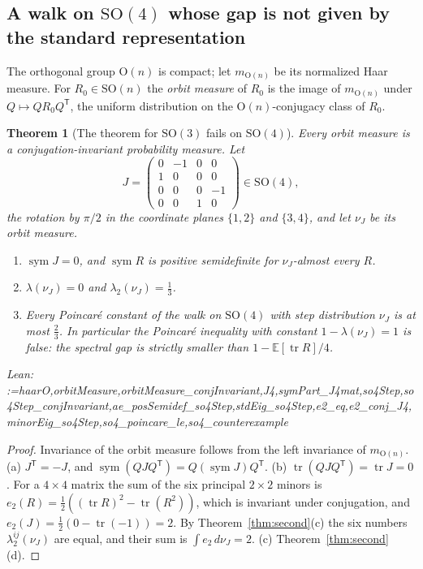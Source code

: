 \documentclass[11pt]{amsart}
\makeatletter
\newtheorem{theorem}{Theorem}[section]
\theoremstyle{definition}
\theoremstyle{remark}
\newcommand{\@leanlist}[1]{\def\@leansep{}\@for\@leanname:=#1\do{\@leansep
  \texttt{\expandafter\detokenize\expandafter{\@leanname}}\def\@leansep{, }}}
\newcommand{\lean}[1]{\par\smallskip\noindent
  {\footnotesize\normalfont\raggedright\textsf{Lean:} \@leanlist{#1}\par}}
\newcommand{\E}{\mathbb{E}}
\newcommand{\SO}{\mathrm{SO}}
\newcommand{\Or}{\mathrm{O}}
\newcommand{\tr}{\operatorname{tr}}
\newcommand{\sym}{\operatorname{sym}}
\newcommand{\transp}{^{\mathsf T}}
\makeatother
\begin{document}
\subsection{A walk on \texorpdfstring{$\SO(4)$}{SO(4)} whose gap is not given by the standard representation}
The orthogonal group $\Or(n)$ is compact; let $m_{\Or(n)}$ be its normalized Haar measure.  For
$R_0\in\SO(n)$ the \emph{orbit measure} of $R_0$ is the image of $m_{\Or(n)}$ under
$Q\mapsto QR_0Q\transp$, the uniform distribution on the $\Or(n)$-conjugacy class of $R_0$.

\begin{theorem}[The theorem for $\SO(3)$ fails on $\SO(4)$]\label{thm:so4}
Every orbit measure is a conjugation-invariant probability measure.  Let
\[
  J=\begin{pmatrix}0&-1&0&0\\1&0&0&0\\0&0&0&-1\\0&0&1&0\end{pmatrix}\in\SO(4),
\]
the rotation by $\pi/2$ in the coordinate planes $\{1,2\}$ and $\{3,4\}$, and let $\nu_J$ be its
orbit measure.
\begin{enumerate}
\item[(a)] $\sym J=0$, and $\sym R$ is positive semidefinite for $\nu_J$-almost every $R$.
\item[(b)] $\lambda(\nu_J)=0$ and $\lambda_2(\nu_J)=\tfrac13$.
\item[(c)] Every Poincar\'e constant of the walk on $\SO(4)$ with step distribution $\nu_J$ is
at most $\tfrac23$.  In particular the Poincar\'e inequality with constant
$1-\lambda(\nu_J)=1$ is false: the spectral gap is strictly smaller than
$1-\E[\tr R]/4$.
\end{enumerate}
\lean{haarO,orbitMeasure,orbitMeasure_conjInvariant,J4,symPart_J4mat,so4Step,so4Step_conjInvariant,ae_posSemidef_so4Step,stdEig_so4Step,e2_eq,e2_conj_J4,minorEig_so4Step,so4_poincare_le,so4_counterexample}
\end{theorem}

\begin{proof}
Invariance of the orbit measure follows from the left invariance of $m_{\Or(n)}$.  (a)
$J\transp=-J$, and $\sym(QJQ\transp)=Q(\sym J)Q\transp$.  (b) $\tr(QJQ\transp)=\tr J=0$.  For a $4\times4$ matrix the sum of the six
principal $2\times2$ minors is $e_2(R)=\tfrac12((\tr R)^2-\tr(R^2))$, which is invariant under
conjugation, and $e_2(J)=\tfrac12(0-\tr(-1))=2$.  By Theorem~\ref{thm:second}(c) the six numbers
$\lambda_2^{ij}(\nu_J)$ are equal, and their sum is $\int e_2\,d\nu_J=2$.  (c)
Theorem~\ref{thm:second}(d).
\end{proof}
\end{document}
